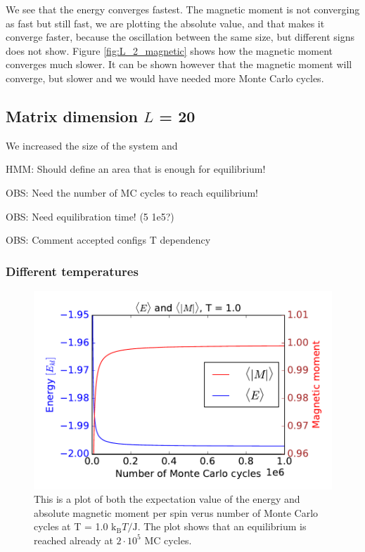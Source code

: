 We see that the energy converges fastest. The magnetic moment is not converging as fast but still fast, we are plotting the absolute value, and that makes it converge faster, because the oscillation between the same size, but different signs does not show. Figure \ref{fig:L_2_magnetic} shows how the magnetic moment converges much slower. It can be shown however that the magnetic moment will converge, but slower and we would have needed more Monte Carlo cycles. 

\subsection{Matrix dimension $L$ = 20}

We increased the size of the system and 

HMM: Should define an area that is enough for equilibrium!

OBS: Need the number of MC cycles to reach equilibrium!

OBS: Need equilibration time! (5 1e5?)

OBS: Comment accepted configs T dependency

\subsubsection{Different temperatures}

\begin{figure}[H]
\includegraphics[width=\linewidth]{../results/4c/En_mag_T1_0}\caption{This is a plot of both the expectation value of the energy and absolute magnetic moment per spin verus number of Monte Carlo cycles at T = 1.0 $\text{k}_\text{B}T/\text{J}$. The plot shows that an equilibrium is reached already at $2 \cdot 10^{5}$ MC cycles.}\label{fig:L_20_energy_mag_T_1.0}
\end{figure}

